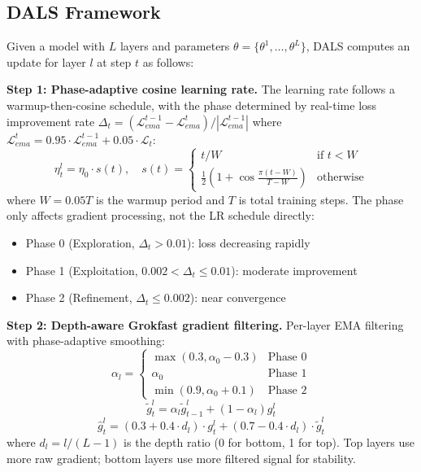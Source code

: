 \documentclass[a4paper,fleqn]{cas-dc}
\begin{document}
\subsection{DALS Framework}

Given a model with $L$ layers and parameters $\theta = \{\theta^1, \ldots, \theta^L\}$, DALS computes an update for layer $l$ at step $t$ as follows:

\textbf{Step 1: Phase-adaptive cosine learning rate.} The learning rate follows a warmup-then-cosine schedule, with the phase determined by real-time loss improvement rate $\Delta_t = (\mathcal{L}_{ema}^{t-1} - \mathcal{L}_{ema}^t) / |\mathcal{L}_{ema}^{t-1}|$ where $\mathcal{L}_{ema}^t = 0.95 \cdot \mathcal{L}_{ema}^{t-1} + 0.05 \cdot \mathcal{L}_t$:
\begin{equation}\label{eq:dals_lr}
\eta_t^l = \eta_0 \cdot s(t), \quad s(t) = \begin{cases} t / W & \text{if } t < W \\ \frac{1}{2}\left(1 + \cos\frac{\pi(t - W)}{T - W}\right) & \text{otherwise} \end{cases}
\end{equation}
where $W = 0.05T$ is the warmup period and $T$ is total training steps. The phase only affects gradient processing, not the LR schedule directly:
\begin{itemize}
\item Phase 0 (Exploration, $\Delta_t > 0.01$): loss decreasing rapidly
\item Phase 1 (Exploitation, $0.002 < \Delta_t \leq 0.01$): moderate improvement
\item Phase 2 (Refinement, $\Delta_t \leq 0.002$): near convergence
\end{itemize}

\textbf{Step 2: Depth-aware Grokfast gradient filtering.} Per-layer EMA filtering with phase-adaptive smoothing:
\begin{equation}\label{eq:dals_alpha}
\alpha_l = \begin{cases} \max(0.3, \alpha_0 - 0.3) & \text{Phase 0} \\ \alpha_0 & \text{Phase 1} \\ \min(0.9, \alpha_0 + 0.1) & \text{Phase 2} \end{cases}
\end{equation}
\begin{equation}\label{eq:dals_ema}
\tilde{g}_t^l = \alpha_l \tilde{g}_{t-1}^l + (1 - \alpha_l) g_t^l
\end{equation}
\begin{equation}\label{eq:dals_blend}
\hat{g}_t^l = (0.3 + 0.4 \cdot d_l) \cdot g_t^l + (0.7 - 0.4 \cdot d_l) \cdot \tilde{g}_t^l
\end{equation}
where $d_l = l / (L-1)$ is the depth ratio (0 for bottom, 1 for top). Top layers use more raw gradient; bottom layers use more filtered signal for stability.
\end{document}
